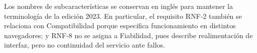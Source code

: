 Los nombres de subcaracterísticas se conservan en inglés para mantener la
terminología de la edición 2023. En particular, el requisito RNF-2 también se
relaciona con Compatibilidad porque especifica funcionamiento en distintos
navegadores; y RNF-8 no se asigna a Fiabilidad, pues describe realimentación de
interfaz, pero no continuidad del servicio ante fallos.
